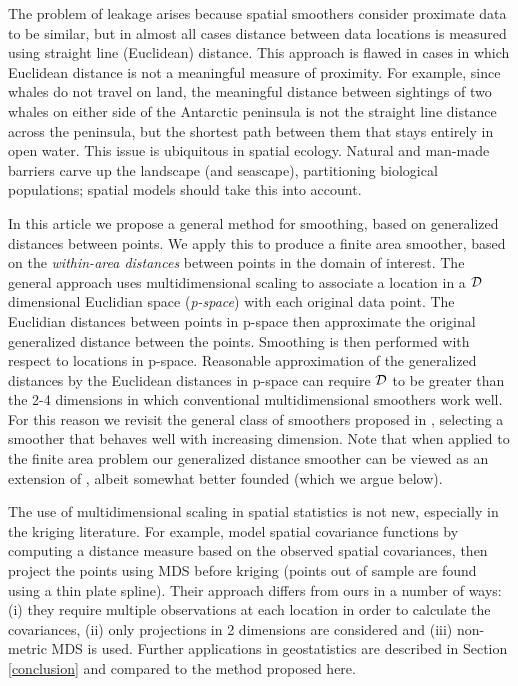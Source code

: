 \documentclass[smallextended]{svjour3}       %
\begin{document}
The problem of leakage arises because spatial smoothers consider proximate data to be similar, but in almost all cases distance between data locations is measured using straight line (Euclidean) distance. This approach is flawed in cases in which Euclidean distance is not a meaningful measure of proximity. For example, since whales do not travel on land, the meaningful distance between sightings of two whales on either side of the Antarctic peninsula is not the straight line distance across the peninsula, but the shortest path between them that stays entirely in open water. This issue is ubiquitous in spatial ecology. Natural and man-made barriers carve up the landscape (and seascape), partitioning biological populations; spatial models should take this into account. 

In this article we propose a general method for smoothing, based on generalized distances between points. We apply this to produce a finite area smoother, based on the \textit{within-area distances} between points in the domain of interest. The general approach uses multidimensional scaling \citep[MDS; e.g.][Chapter 10]{chatfield1980introduction} to associate a location in a $\cal D$ dimensional Euclidian space ({\em p-space}) with each original data point. The Euclidian distances between points in p-space then approximate the original generalized distance between the points. Smoothing is then performed with respect to locations in p-space. Reasonable approximation of the generalized distances by the Euclidean distances in p-space can require $\cal D$ to be greater than the 2-4 dimensions in which conventional multidimensional smoothers work well. For this reason we revisit the general class of smoothers proposed in \cite{Duchon:1977tr}, selecting a smoother that behaves well with increasing dimension. Note that when applied to the finite area problem our generalized distance smoother can be viewed as an  extension of \cite{Wang:2007tf}, albeit somewhat better founded (which we argue below).

The use of multidimensional scaling in spatial statistics is not new, especially in the kriging literature. For example, \cite{Sampson:1992wm} model spatial covariance functions by computing a distance measure based on the observed spatial covariances, then project the points using MDS before kriging (points out of sample are found using a thin plate spline). Their approach differs from ours in a number of ways: (i) they require multiple observations at each location in order to calculate the covariances, (ii) only projections in 2 dimensions are considered and (iii) non-metric MDS is used. Further applications in geostatistics are described in Section \ref{conclusion} and compared to the method proposed here.
\end{document}
